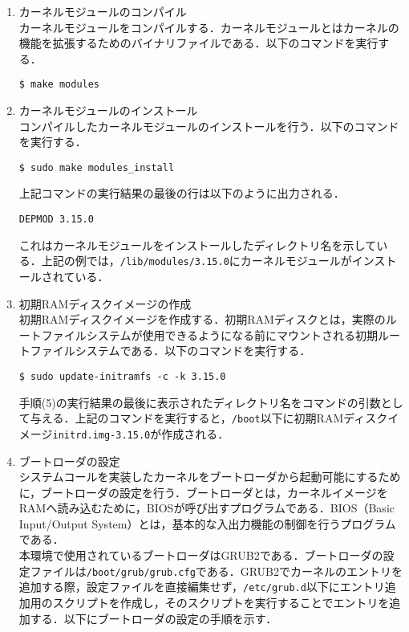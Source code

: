 \documentclass[12pt]{jsarticle}
\begin{document}
\begin{enumerate}
\item カーネルモジュールのコンパイル \\
  カーネルモジュールをコンパイルする．カーネルモジュールとはカーネルの機能を拡張するためのバイナリファイルである．以下のコマンドを実行する．

\begin{verbatim}
$ make modules
\end{verbatim}
  
\item カーネルモジュールのインストール \\
  コンパイルしたカーネルモジュールのインストールを行う．以下のコマンドを実行する．

\begin{verbatim}
$ sudo make modules_install
\end{verbatim}
上記コマンドの実行結果の最後の行は以下のように出力される．

\begin{verbatim}
DEPMOD 3.15.0
\end{verbatim}
これはカーネルモジュールをインストールしたディレクトリ名を示している．上記の例では，\verb|/lib/modules/3.15.0|にカーネルモジュールがインストールされている．

\item 初期RAMディスクイメージの作成 \\
  初期RAMディスクイメージを作成する．初期RAMディスクとは，実際のルートファイルシステムが使用できるようになる前にマウントされる初期ルートファイルシステムである．以下のコマンドを実行する．

\begin{verbatim}
$ sudo update-initramfs -c -k 3.15.0
\end{verbatim}
手順(5)の実行結果の最後に表示されたディレクトリ名をコマンドの引数として与える．上記のコマンドを実行すると，\verb|/boot|以下に初期RAMディスクイメージ\verb|initrd.img-3.15.0|が作成される．

\item ブートローダの設定 \\
  システムコールを実装したカーネルをブートローダから起動可能にするために，ブートローダの設定を行う．ブートローダとは，カーネルイメージをRAMへ読み込むために，BIOSが呼び出すプログラムである．BIOS（Basic Input/Output System）とは，基本的な入出力機能の制御を行うプログラムである\cite{daniel2007}．\\
  本環境で使用されているブートローダはGRUB2である．ブートローダの設定ファイルは\verb|/boot/grub/grub.cfg|である．GRUB2でカーネルのエントリを追加する際，設定ファイルを直接編集せず，\verb|/etc/grub.d|以下にエントリ追加用のスクリプトを作成し，そのスクリプトを実行することでエントリを追加する．以下にブートローダの設定の手順を示す．
  

\end{enumerate}
\end{document}
